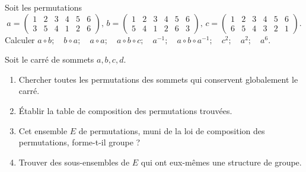 \documentclass[12pt,french,oneside,a4paper]{memoir} %
\begin{document}
\begin{exo}
Soit les permutations
\begin{equation*}
a= 
\left( \begin{array}{llllll}
1 &2 &3 &4 &5 &6 \\
3 &5 &4 &1 &2 &6
\end{array} \right), \,
b= \left( \begin{array}{llllll}
1 &2 &3 &4 &5 &6 \\
5 &4 &1 &2 &6 &3
\end{array} \right), \, 
c= \left( \begin{array}{llllll}
1 &2 &3 &4 &5 &6 \\
6 &5 &4 &3 &2 &1
\end{array} \right).
\end{equation*}
Calculer $a \circ b; \quad b \circ a; \quad a \circ a; \quad a \circ b \circ c; \quad a^{-1}; \quad a \circ b \circ a^{-1}; \quad c^2; \quad a^2; \quad a^6$.
\end{exo}
\begin{exo}
  Soit le carré de sommets $a,b,c,d$.
  \begin{enumerate}
  \item Chercher toutes les permutations des sommets qui conservent globalement le carré.
  \item Établir la \og table de composition\fg{} des permutations trouvées.
  \item Cet ensemble $E$ de permutations, muni de la loi de composition des permutations, forme-t-il groupe ?
  \item Trouver des sous-ensembles de $E$ qui ont eux-mêmes une structure de groupe.
  \end{enumerate}
\end{exo}


\end{document}

